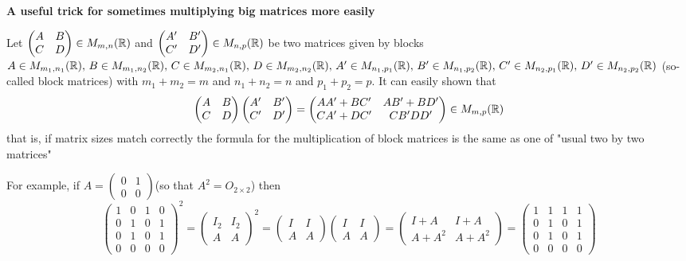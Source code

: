 \documentclass[10pt, a4paper]{article}
\begin{document}
\textbf{A useful trick for sometimes multiplying big matrices more easily}

Let $\begin{pmatrix}
    A & B \\ C & D
\end{pmatrix} \in M_{m, n}(\mathbb{R})$ and $\begin{pmatrix}
    A' & B' \\ C' & D'
\end{pmatrix} \in M_{n, p}(\mathbb{R})$ be two matrices given by blocks $A \in M_{m_1, n_1}(\mathbb{R}),\, B \in M_{m_1, n_2}(\mathbb{R}),\, C \in M_{m_2, n_1}(\mathbb{R}),\, D \in M_{m_2, n_2}(\mathbb{R}),\, A' \in M_{n_1, p_1}(\mathbb{R}),\, B' \in M_{n_1, p_2}(\mathbb{R}),\, C' \in M_{n_2, p_1}(\mathbb{R}),\, D' \in M_{n_2, p_2}(\mathbb{R})$ (so-called block matrices) with $m_1 + m_2 = m$ and $n_1 + n_2 = n$ and $p_1 + p_2 = p$. It can easily shown that
\[
\begin{pmatrix}
    A & B \\ C & D
\end{pmatrix}
\begin{pmatrix}
    A' & B' \\ C' & D'
\end{pmatrix}
=
\begin{pmatrix}
    AA' + BC' & AB' + BD' \\ CA' + DC' & CB' DD'
\end{pmatrix} \in M_{m, p}(\mathbb{R})
\]
that is, if matrix sizes match correctly the formula for the multiplication of block matrices is the same as one of "usual two by two matrices"

For example, if $A = \begin{pmatrix}
    0 & 1 \\ 0 & 0
\end{pmatrix}$(so that $A ^ 2 = O_{2 \times 2}$) then
\[
\begin{pmatrix}
    1 & 0 & 1 & 0 \\
    0 & 1 & 0 & 1 \\
    0 & 1 & 0 & 1 \\
    0 & 0 & 0 & 0
\end{pmatrix} ^ 2
=
\begin{pmatrix}
    I_2 & I_2 \\ A & A
\end{pmatrix} ^ 2
=
\begin{pmatrix}
    I & I \\ A & A
\end{pmatrix}
\begin{pmatrix}
    I & I \\ A & A
\end{pmatrix}
=
\begin{pmatrix}
    I + A & I + A \\ A + A ^ 2 & A + A ^ 2
\end{pmatrix}
=
\begin{pmatrix}
    1 & 1 & 1 & 1 \\
    0 & 1 & 0 & 1 \\
    0 & 1 & 0 & 1 \\
    0 & 0 & 0 & 0
\end{pmatrix}
\]
\end{document}
